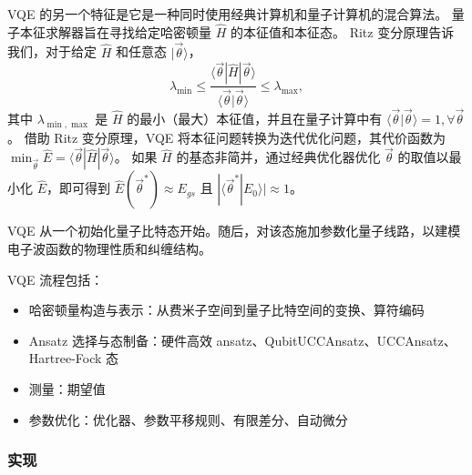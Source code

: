 VQE 的另一个特征是它是一种同时使用经典计算机和量子计算机的混合算法。
量子本征求解器旨在寻找给定哈密顿量 $\hat{H}$ 的本征值和本征态。
Ritz 变分原理告诉我们，对于给定 $\hat{H}$ 和任意态 $|\vec{\theta}\rangle$，
\begin{equation}
    \lambda_{\min}\leq \frac{\langle \vec{\theta} |\hat{H}| \vec{\theta}\rangle}{\langle \vec{\theta}|\vec{\theta}\rangle} \leq \lambda_{\max},
\end{equation}
其中 $\lambda_{\min, \max}$ 是 $\hat{H}$ 的最小（最大）本征值，并且在量子计算中有 $\langle \vec{\theta}|\vec{\theta}\rangle = 1, \forall \vec{\theta}$。
借助 Ritz 变分原理，VQE 将本征问题转换为迭代优化问题，其代价函数为 $\min_{\vec{\theta}}\hat{E}= \langle \vec{\theta} |\hat{H}| \vec{\theta}\rangle$。
如果 $\hat{H}$ 的基态非简并，通过经典优化器优化 $\vec{\theta}$ 的取值以最小化 $\hat{E}$，即可得到 $\hat{E}(\vec{\theta}^*)\approx E_{gs}$ 且 $|\langle \vec{\theta}^*|E_0\rangle| \approx 1$。

VQE 从一个初始化量子比特态开始。随后，对该态施加参数化量子线路，以建模电子波函数的物理性质和纠缠结构。

VQE 流程包括：
\begin{itemize}
    \item 哈密顿量构造与表示：从费米子空间到量子比特空间的变换、算符编码
    \item Ansatz 选择与态制备：硬件高效 ansatz、QubitUCCAnsatz、UCCAnsatz、Hartree-Fock 态
    \item 测量：期望值
    \item 参数优化：优化器、参数平移规则、有限差分、自动微分
\end{itemize}

\subsubsection{实现}

